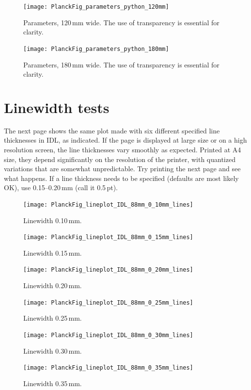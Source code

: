 \documentclass[traditabstract]{aa}
\begin{document}
\begin{figure}[H!b]
\sidecaption
\texttt{[image: PlanckFig\_parameters\_python\_120mm]}
\caption{Parameters, 120\,mm wide.  The use of transparency is essential for clarity.}
\label{fig:parameters_python120}
\end{figure}

\begin{figure}[H!b]
\texttt{[image: PlanckFig\_parameters\_python\_180mm]}
\caption{Parameters, 180\,mm wide.  The use of transparency is essential for clarity.}
\label{fig:parameters_python180}
\end{figure}

\clearpage


\section{Linewidth tests}

The next page shows the same plot made with six different specified line thicknesses
in IDL, as indicated.  If the page is displayed at large size or on a high
resolution screen, the line thicknesses vary smoothly as expected.  Printed at A4 size, they depend significantly on the resolution of the printer, with quantized variations that are somewhat unpredictable.  Try printing the next page and see what happens.  If a line thickness needs to be specified (defaults are most likely OK), use 0.15--0.20\,mm (call it 0.5\,pt).  

\clearpage

\begin{figure}
\texttt{[image: PlanckFig\_lineplot\_IDL\_88mm\_0\_10mm\_lines]}
\caption{Linewidth 0.10\,mm.}
\label{fig:parameters_python88}
\end{figure}


\begin{figure}
\texttt{[image: PlanckFig\_lineplot\_IDL\_88mm\_0\_15mm\_lines]}
\caption{Linewidth 0.15\,mm.}
\label{fig:parameters_python88}
\end{figure}



\begin{figure}
\texttt{[image: PlanckFig\_lineplot\_IDL\_88mm\_0\_20mm\_lines]}
\caption{Linewidth 0.20\,mm.}
\label{fig:parameters_python88}
\end{figure}



\begin{figure}
\texttt{[image: PlanckFig\_lineplot\_IDL\_88mm\_0\_25mm\_lines]}
\caption{Linewidth 0.25\,mm.}
\label{fig:parameters_python88}
\end{figure}



\begin{figure}
\texttt{[image: PlanckFig\_lineplot\_IDL\_88mm\_0\_30mm\_lines]}
\caption{Linewidth 0.30\,mm.}
\label{fig:parameters_python88}
\end{figure}



\begin{figure}
\texttt{[image: PlanckFig\_lineplot\_IDL\_88mm\_0\_35mm\_lines]}
\caption{Linewidth 0.35\,mm.}
\label{fig:parameters_python88}
\end{figure}
\end{document}
